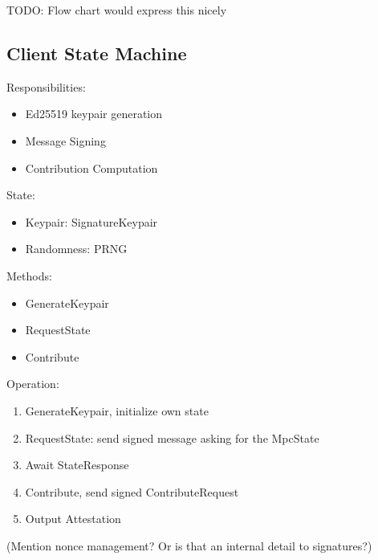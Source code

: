 TODO: Flow chart would express this nicely

\subsection{Client State Machine}
Responsibilities:
\begin{itemize}
    \item Ed25519 keypair generation
    \item Message Signing
    \item Contribution Computation
\end{itemize}
State:
\begin{itemize}
    \item Keypair: SignatureKeypair
    \item Randomness: PRNG
\end{itemize}
Methods:
\begin{itemize}
    \item GenerateKeypair
    \item RequestState
    \item Contribute
\end{itemize}
Operation:
\begin{enumerate}
    \item GenerateKeypair, initialize own state
    \item RequestState: send signed message asking for the MpcState
    \item Await StateResponse 
    \item Contribute, send signed ContributeRequest
    \item Output Attestation
\end{enumerate}
(Mention nonce management? Or is that an internal detail to signatures?)